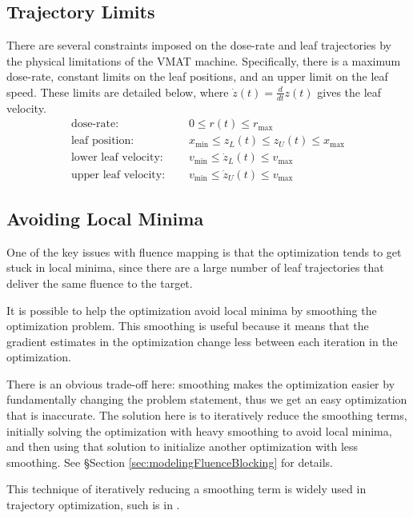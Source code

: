 \subsection{Trajectory Limits}

There are several constraints imposed on the dose-rate and leaf trajectories
by the physical limitations of the VMAT machine. Specifically, there is a maximum dose-rate,
constant limits on the leaf positions, and an upper limit on the leaf speed.
These limits are detailed below, where $\dot{z}(t) = \tfrac{d}{dt}z(t)$ gives the leaf velocity.
\begin{align}
  \text{dose-rate: }& \quad 0 \leq r(t) \leq r_\text{max}
      \label{eqn:FirstTrajectoryConstraint}\\
  \text{leaf position: }& \quad x_\text{min} \leq z_L(t) \leq z_U(t) \leq x_\text{max} \\
  \text{lower leaf velocity: }& \quad v_\text{min} \leq \dot{z}_L(t) \leq v_\text{max} \\
  \text{upper leaf velocity: }& \quad v_\text{min} \leq \dot{z}_U(t) \leq v_\text{max}
      \label{eqn:LastTrajectoryConstraint}
\end{align}

\subsection{Avoiding Local Minima}

One of the key issues with fluence mapping is that the
optimization tends to get stuck in local minima,
since there are a large number of leaf trajectories that deliver the same fluence to the target.

It is possible to help the optimization avoid local minima by smoothing the optimization problem.
This smoothing is useful because it means that the gradient estimates in the optimization change less
between each iteration in the optimization.

There is an obvious trade-off here: smoothing makes the optimization easier by fundamentally changing the problem statement,
thus we get an easy optimization that is inaccurate.
The solution here is to iteratively reduce the smoothing terms,
initially solving the optimization with heavy smoothing to avoid local minima,
and then using that solution to initialize another optimization with less smoothing.
See \S Section \ref{sec:modelingFluenceBlocking} for details.

This technique of iteratively reducing a smoothing term is widely used in trajectory optimization,
such is in \cite{Srinivasan2006}.


